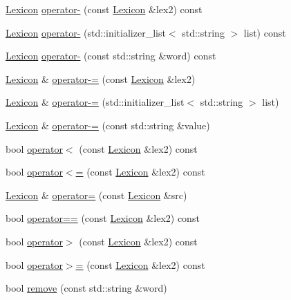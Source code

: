 \begin{DoxyCompactItemize}
\item 
\mbox{\hyperlink{classLexicon}{Lexicon}} \mbox{\hyperlink{classLexicon_a487624601a6357e1b6d64053f9ebb5e2}{operator-\/}} (const \mbox{\hyperlink{classLexicon}{Lexicon}} \&lex2) const
\item 
\mbox{\hyperlink{classLexicon}{Lexicon}} \mbox{\hyperlink{classLexicon_a0cd415d08567bfae9eae12afe2169cb5}{operator-\/}} (std\+::initializer\+\_\+list$<$ std\+::string $>$ list) const
\item 
\mbox{\hyperlink{classLexicon}{Lexicon}} \mbox{\hyperlink{classLexicon_a14c8fea4b958b02ea5ee55d5509db8e6}{operator-\/}} (const std\+::string \&word) const
\item 
\mbox{\hyperlink{classLexicon}{Lexicon}} \& \mbox{\hyperlink{classLexicon_ac51e54102d6257c1a0a48c99ad2520f6}{operator-\/=}} (const \mbox{\hyperlink{classLexicon}{Lexicon}} \&lex2)
\item 
\mbox{\hyperlink{classLexicon}{Lexicon}} \& \mbox{\hyperlink{classLexicon_a1b3ac9124341c069a604d760190789b1}{operator-\/=}} (std\+::initializer\+\_\+list$<$ std\+::string $>$ list)
\item 
\mbox{\hyperlink{classLexicon}{Lexicon}} \& \mbox{\hyperlink{classLexicon_a4acb1cafdecdbf77b1d62f2372a6d244}{operator-\/=}} (const std\+::string \&value)
\item 
bool \mbox{\hyperlink{classLexicon_aad808851ca0fffc8b60fd0b69ad097bd}{operator$<$}} (const \mbox{\hyperlink{classLexicon}{Lexicon}} \&lex2) const
\item 
bool \mbox{\hyperlink{classLexicon_a236ec3f5ec721fb4ca4551bf49123eac}{operator$<$=}} (const \mbox{\hyperlink{classLexicon}{Lexicon}} \&lex2) const
\item 
\mbox{\hyperlink{classLexicon}{Lexicon}} \& \mbox{\hyperlink{classLexicon_ab9766b3af1f48ed51a1bcf037e08de43}{operator=}} (const \mbox{\hyperlink{classLexicon}{Lexicon}} \&src)
\item 
bool \mbox{\hyperlink{classLexicon_a4fcab616682564bf55eb0b096a35219d}{operator==}} (const \mbox{\hyperlink{classLexicon}{Lexicon}} \&lex2) const
\item 
bool \mbox{\hyperlink{classLexicon_a04139ff41f8d25adbf5958ff2b01b068}{operator$>$}} (const \mbox{\hyperlink{classLexicon}{Lexicon}} \&lex2) const
\item 
bool \mbox{\hyperlink{classLexicon_a05b7f6593b8b859858cf21ffbc9e5ab1}{operator$>$=}} (const \mbox{\hyperlink{classLexicon}{Lexicon}} \&lex2) const
\item 
bool \mbox{\hyperlink{classLexicon_affc6169b054fb3bbc4d72694e1a5834e}{remove}} (const std\+::string \&word)

\end{DoxyCompactItemize}
